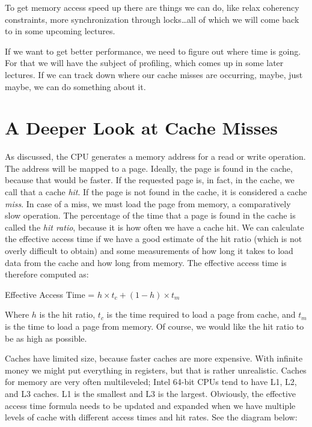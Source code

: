 \documentclass[a4paper]{report}
\begin{document}
To get memory access speed up there are things we can do, like relax coherency constraints, more synchronization through locks\ldots all of which we will come back to in some upcoming lectures. 

If we want to get better performance, we need to figure out where time is going. For that we will have the subject of profiling, which comes up in some later lectures. If we can track down where our cache misses are occurring, maybe, just maybe, we can do something about it. 

\section*{A Deeper Look at Cache Misses}

As discussed, the CPU generates a memory address for a read or write operation. The address will be mapped to a page. Ideally, the page is found in the cache, because that would be faster. If the requested page is, in fact,  in the cache, we call that a cache \textit{hit}. If the page is not found in the cache, it is considered a cache \textit{miss}. In case of a miss, we must load the page from memory, a comparatively slow operation. The percentage of the time that a page is found in the cache is called the \textit{hit ratio}, because it is how often we have a cache hit. We can calculate the effective access time if we have a good estimate of the hit ratio (which is not overly difficult to obtain) and some measurements of how long it takes to load data from the cache and how long from memory. The effective access time is therefore computed as:

\begin{center}
Effective Access Time = $h \times t_{c} + (1-h) \times t_{m}$
\end{center}

Where $h$ is the hit ratio, $t_{c}$ is the time required to load a page from cache, and $t_{m}$ is the time to load a page from memory. Of course, we would like the hit ratio to be as high as possible. 

Caches have limited size, because faster caches are more expensive. With infinite money we might put everything in registers, but that is rather unrealistic. Caches for memory are very often multileveled; Intel 64-bit CPUs tend to have L1, L2, and L3 caches. L1 is the smallest and L3 is the largest. Obviously, the effective access time formula needs to be updated and expanded when we have multiple levels of cache with different access times and hit rates. See the diagram below:
\end{document}
